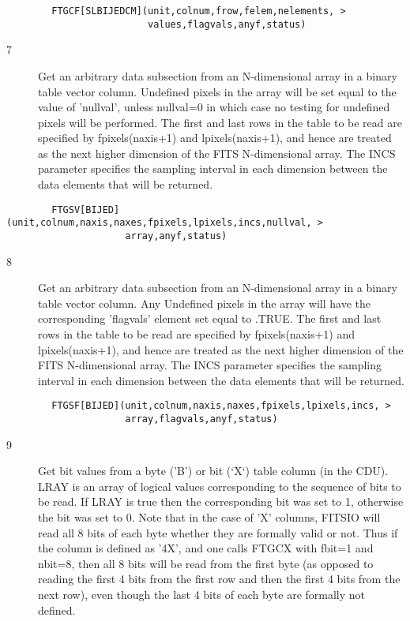 \documentclass[11pt]{book}
\begin{document}
\begin{verbatim}
        FTGCF[SLBIJEDCM](unit,colnum,frow,felem,nelements, >
                         values,flagvals,anyf,status)
\end{verbatim}

\begin{description}
\item[7 ] Get an arbitrary data subsection from an N-dimensional array
    in a binary table vector column.  Undefined pixels
    in the array will be set equal to the value of 'nullval',
    unless nullval=0 in which case no testing for undefined pixels will
    be performed.  The first and last rows in the table to be read
    are specified by fpixels(naxis+1) and lpixels(naxis+1), and hence
    are treated as the next higher dimension of the FITS N-dimensional
    array.  The INCS parameter specifies the sampling interval in
   each dimension between the data elements that will be returned.
\end{description}

\begin{verbatim}
        FTGSV[BIJED](unit,colnum,naxis,naxes,fpixels,lpixels,incs,nullval, >
                     array,anyf,status)
\end{verbatim}

\begin{description}
\item[8 ] Get an arbitrary data subsection from an N-dimensional array
    in a binary table vector column.  Any Undefined
    pixels in the array will have the corresponding 'flagvals'
    element set equal to .TRUE.   The first and last rows in the table
    to be read are specified by fpixels(naxis+1) and lpixels(naxis+1),
    and hence are treated as the next higher dimension of the FITS
    N-dimensional array.  The INCS parameter specifies the sampling
    interval in each dimension between the data elements that will be
   returned.
\end{description}

\begin{verbatim}
        FTGSF[BIJED](unit,colnum,naxis,naxes,fpixels,lpixels,incs, >
                     array,flagvals,anyf,status)
\end{verbatim}

\begin{description}
\item[9 ] Get bit values from a byte ('B') or bit (`X`) table column (in the
    CDU).  LRAY is an array of logical values corresponding to the
    sequence of bits to be read.  If LRAY is true then the
    corresponding bit was set to 1, otherwise the bit was set to 0.
    Note that in the case of 'X' columns, FITSIO will read  all 8 bits
    of each byte whether they are formally valid or not.  Thus if the
    column is defined as '4X', and one calls FTGCX with  fbit=1 and
    nbit=8, then all 8 bits will be read from the first byte (as
    opposed to reading the first 4 bits from the first row and then the
    first 4 bits from the next row), even though the last 4 bits of
   each byte are formally not defined.
\end{description}
\end{document}
